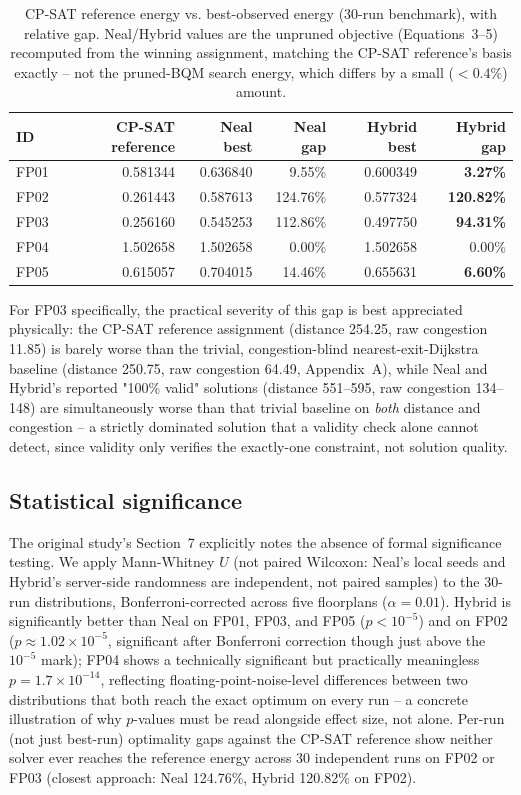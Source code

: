 \documentclass[11pt]{article}
\begin{document}
\begin{table}[h]
\centering
\caption{CP-SAT reference energy vs. best-observed energy (30-run benchmark), with relative gap. Neal/Hybrid values are the unpruned objective (Equations~3--5) recomputed from the winning assignment, matching the CP-SAT reference's basis exactly -- not the pruned-BQM search energy, which differs by a small ($<0.4\%$) amount.}
\label{tab:milpgaps}
\small
\begin{tabular}{lrrrrr}
\toprule
ID & CP-SAT reference & Neal best & Neal gap & Hybrid best & Hybrid gap \\
\midrule
FP01 & 0.581344 & 0.636840 & 9.55\% & 0.600349 & \textbf{3.27\%} \\
FP02 & 0.261443 & 0.587613 & 124.76\% & 0.577324 & \textbf{120.82\%} \\
FP03 & 0.256160 & 0.545253 & 112.86\% & 0.497750 & \textbf{94.31\%} \\
FP04 & 1.502658 & 1.502658 & 0.00\% & 1.502658 & 0.00\% \\
FP05 & 0.615057 & 0.704015 & 14.46\% & 0.655631 & \textbf{6.60\%} \\
\bottomrule
\end{tabular}
\end{table}

For FP03 specifically, the practical severity of this gap is best appreciated physically: the CP-SAT reference assignment (distance 254.25, raw congestion 11.85) is barely worse than the trivial, congestion-blind nearest-exit-Dijkstra baseline (distance 250.75, raw congestion 64.49, Appendix~A), while Neal and Hybrid's reported "100\% valid" solutions (distance 551--595, raw congestion 134--148) are simultaneously worse than that trivial baseline on \emph{both} distance and congestion -- a strictly dominated solution that a validity check alone cannot detect, since validity only verifies the exactly-one constraint, not solution quality.

\subsection{Statistical significance}
\label{sec:significance}
The original study's Section~7 explicitly notes the absence of formal significance testing. We apply Mann-Whitney $U$ (not paired Wilcoxon: Neal's local seeds and Hybrid's server-side randomness are independent, not paired samples) to the 30-run distributions, Bonferroni-corrected across five floorplans ($\alpha=0.01$). Hybrid is significantly better than Neal on FP01, FP03, and FP05 ($p<10^{-5}$) and on FP02 ($p\approx1.02\times10^{-5}$, significant after Bonferroni correction though just above the $10^{-5}$ mark); FP04 shows a technically significant but practically meaningless $p=1.7\times10^{-14}$, reflecting floating-point-noise-level differences between two distributions that both reach the exact optimum on every run -- a concrete illustration of why $p$-values must be read alongside effect size, not alone. Per-run (not just best-run) optimality gaps against the CP-SAT reference show neither solver ever reaches the reference energy across 30 independent runs on FP02 or FP03 (closest approach: Neal 124.76\%, Hybrid 120.82\% on FP02).
\end{document}
